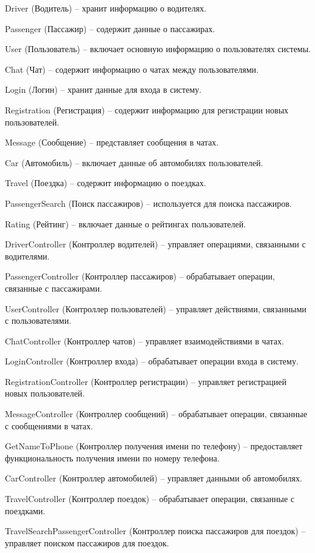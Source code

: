 Driver (Водитель) -- хранит информацию о водителях.

Passenger (Пассажир) -- содержит данные о пассажирах.

User (Пользователь) -- включает основную информацию о пользователях системы.

Chat (Чат) -- содержит информацию о чатах между пользователями.

Login (Логин) -- хранит данные для входа в систему.

Registration (Регистрация) -- содержит информацию для регистрации новых пользователей.

Message (Сообщение) -- представляет сообщения в чатах.

Car (Автомобиль) -- включает данные об автомобилях пользователей.

Travel (Поездка) -- содержит информацию о поездках.

PassengerSearch (Поиск пассажиров) -- используется для поиска пассажиров.

Rating (Рейтинг) -- включает данные о рейтингах пользователей.

DriverController (Контроллер водителей) -- управляет операциями, связанными с водителями.

PassengerController (Контроллер пассажиров) -- обрабатывает операции, связанные с пассажирами.

UserController (Контроллер пользователей) -- управляет действиями, связанными с пользователями.

ChatController (Контроллер чатов) -- управляет взаимодействиями в чатах.

LoginController (Контроллер входа) -- обрабатывает операции входа в систему.

RegistrationController (Контроллер регистрации) -- управляет регистрацией новых пользователей.

MessageController (Контроллер сообщений) -- обрабатывает операции, связанные с сообщениями в чатах.

GetNameToPhone (Контроллер получения имени по телефону) -- предоставляет функциональность получения имени по номеру телефона.

CarController (Контроллер автомобилей) -- управляет данными об автомобилях.

TravelController (Контроллер поездок) -- обрабатывает операции, связанные с поездками.

TravelSearchPassengerController (Контроллер поиска пассажиров для поездок) -- управляет поиском пассажиров для поездок.

